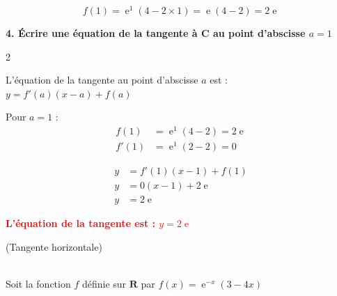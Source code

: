 \documentclass[11pt,a4paper]{article}
\DeclareMathOperator{\e}{e}
\begin{document}
\begin{tcolorbox}[colback=red!5!white,colframe=red!75!black]
{
\[
f(1) = \e^1(4-2 \times 1) = \e(4-2) = 2\e
\]

\begin{center}
\end{center}

}
\end{tcolorbox}

\vspace{3mm}

\textbf{4. Écrire une équation de la tangente à C au point d'abscisse $a=1$}

\begin{tcolorbox}[colback=red!5!white,colframe=red!75!black]
\begin{multicols}{2}
{
L'équation de la tangente au point d'abscisse $a$ est : $y = f'(a)(x-a) + f(a)$

\vspace{2mm}

Pour $a = 1$ :
\[
\begin{aligned}
f(1) &= \e^1(4-2) = 2\e \\
f'(1) &= \e^1(2-2) = 0
\end{aligned}
\]

\vspace{2mm}

\[
\begin{aligned}
y &= f'(1)(x-1) + f(1) \\
y &= 0(x-1) + 2\e \\
y &= 2\e
\end{aligned}
\]

\vspace{2mm}

\begin{center}
\textbf{\textcolor{red}{L'équation de la tangente est : $y = 2\e$}}
\end{center}

(Tangente horizontale)
}
\end{multicols}
\end{tcolorbox}

\newpage

\\ [5 pt]
Soit la fonction $f$ définie sur $\mathbf{R}$ par $f(x)=\e^{-x}(3-4x)$
\end{document}
